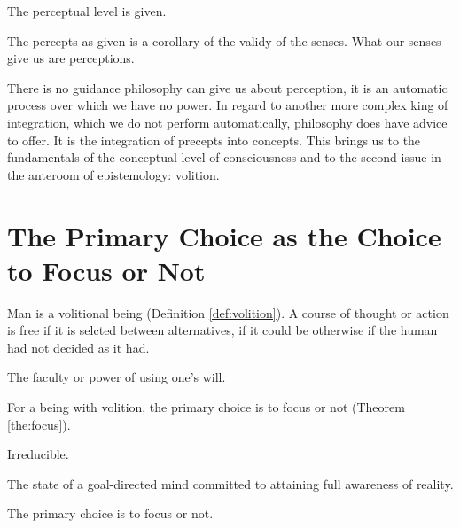             \begin{corollary}
            \label{cor:percepts}
                The perceptual level is given.
            \end{corollary}

            \begin{remark}
                The percepts as given is a corollary of the validy of the senses. What our senses give us are perceptions.
            \end{remark}
    
        There is no guidance philosophy can give us about perception, it is an automatic process over which we have no power. In regard to another more complex king of integration, which we do not perform automatically, philosophy does have advice to offer. It is the integration of precepts into concepts. This brings us to the fundamentals of the conceptual level of consciousness and to the second issue in the anteroom of epistemology: volition.

    \section{The Primary Choice as the Choice to Focus or Not}

        Man is a volitional being (Definition \ref{def:volition}). A course of thought or action is free if it is selcted between alternatives, if it could be otherwise if the human had not decided as it had.

            \begin{definition}[Volition]
            \label{def:volition}
                The faculty or power of using one's will.
            \end{definition}

        For a being with volition, the primary choice is to focus or not (Theorem \ref{the:focus}).

            \begin{definition}[Primary]
            \label{def:primary}
                Irreducible.
            \end{definition}

            \begin{definition}[Focus]
            \label{def:focus}
                The state of a goal-directed mind committed to attaining full awareness of reality.
            \end{definition}

            \begin{theorem}
            \label{the:focus}
                The primary choice is to focus or not.
            \end{theorem}

